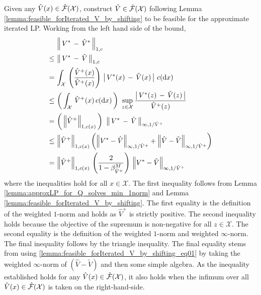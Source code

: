 \documentclass[journal]{IEEEtran}
\newcommand{\bcol}[1]{{\color{black}#1}}
\newcommand{\kcol}[1]{{\color{black}#1}}
\newcommand{\mcal}{\mathcal}
\newcommand{\intd}[1]{\mathrm{d}#1}
\newcommand{\xinX}{x\!\in\!\mathcal{X}}
\newcommand{\approxFuncSpaceX}{\smash{\hat{\mcal{F}}(\mcal{X})}}
\begin{document}
\vspace{0.2cm}


\begin{IEEEproof}

	Given any $\hat{V}(x)\in \approxFuncSpaceX$, construct $\tilde{V} \in \approxFuncSpaceX$ following Lemma \ref{lemma:feasible_forIterated_V_by_shifting} to be feasible for the approximate iterated LP. Working from the left hand side of the bound,
\begin{equation} \nonumber
		\begin{aligned}
			&\, \left\|\, V^\ast \,-\, \hat{V}^\ast \,\right\|_{1,c}
			\\
			\kcol{\leq}&\, \left\|\, V^\ast \,-\, \bcol{\tilde{V}} \,\right\|_{1,c}
			\\
			=&\, \int_{\mcal{X}} \, \left(\frac{\hat{V}^{+}(x)}{\hat{V}^{+}(x)}\right) \, \left|\, V^\ast(x) \,-\, \tilde{V}(x) \,\right| \, c(\intd{x})
			\\
			\kcol{\leq}&\, \left(\, \int_{\mcal{X}} \, \hat{V}^{+}(x) \, c(\intd{x}) \,\right) \,\, \bcol{ \sup_{z\in\mcal{X}} \frac{ \left|\, V^\ast(z) \,-\, \tilde{V}(z) \,\right|}{\hat{V}^{+}(z)} }
			\\
			=&\, \left(\, \bcol{ \left\| \hat{V}^{+} \right\|_{1,c(x)} } \,\right) \,\, \bcol{ \left\|\, V^\ast \,-\, \tilde{V} \,\right\|_{\infty,1/\hat{V}^{+} } }
			\\
			\kcol{\leq}&\, \left\| \hat{V}^{+} \right\|_{1,c(x)}
			\left( \left\| V^\ast - \bcol{ \hat{V} } \right\|_{\infty,1/\hat{V}^{+}} + \left\| \bcol{ \hat{V} } - \tilde{V} \right\|_{\infty,1/\hat{V}^{+} } \right)
			\\
			=&\, \left\| \hat{V}^{+} \right\|_{1,c(x)} \, \left( \frac{2}{1-\beta^{M}_{\hat{V}^{+}} } \right) \, \left\| V^\ast - \hat{V} \right\|_{\infty,1/\hat{V}^{+}} 
		\end{aligned}
	\end{equation}
where the inequalities hold for all $\xinX$. The first inequality follows from Lemma \ref{lemma:approxLP_for_Q_solves_min_1norm} and Lemma \ref{lemma:feasible_forIterated_V_by_shifting}. The first equality is the definition of the weighted $1$-norm and holds as $\hat{V}^+$ is strictly positive. The second inequality holds because the objective of the supremum is non-negative for all $z\!\in\!\mcal{X}$. The second equality is the definition of the weighted $1$-norm and weighted $\infty$-norm. The final inequality follows by the triangle inequality. The final equality stems from using \eqref{lemma:feasible_forIterated_V_by_shifting_eq01} by taking the weighted $\infty$-norm of $(\hat{V}-\tilde{V})$ and then some simple algebra.
As the inequality established holds for any $\hat{V}(x)\in\approxFuncSpaceX$, it also holds when the infimum over all $\hat{V}(x)\in\approxFuncSpaceX$ is taken on the right-hand-side.
	
\end{IEEEproof}
 
\end{document}

